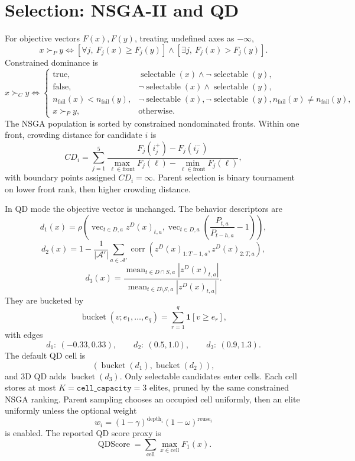 \documentclass[11pt]{article}
\newcommand{\corr}{\operatorname{corr}}
\newcommand{\ind}{\mathbf{1}}
\begin{document}
\section*{Selection: NSGA-II and QD}

For objective vectors \(F(x),F(y)\), treating undefined axes as \(-\infty\),
\[
  x\succ_P y
  \iff
  \left[\forall j,\ F_j(x)\ge F_j(y)\right]
  \land
  \left[\exists j,\ F_j(x)>F_j(y)\right].
\]
Constrained dominance is
\[
  x\succ_C y
  \iff
  \begin{cases}
    \text{true}, & \operatorname{selectable}(x)\land\neg\operatorname{selectable}(y),\\
    \text{false}, & \neg\operatorname{selectable}(x)\land\operatorname{selectable}(y),\\
    n_{\mathrm{fail}}(x)<n_{\mathrm{fail}}(y),
      & \neg\operatorname{selectable}(x),\neg\operatorname{selectable}(y),
        n_{\mathrm{fail}}(x)\ne n_{\mathrm{fail}}(y),\\
    x\succ_P y, & \text{otherwise}.
  \end{cases}
\]
The NSGA population is sorted by constrained nondominated fronts.  Within one
front, crowding distance for candidate \(i\) is
\[
  CD_i=\sum_{j=1}^{5}
  \frac{F_j(i_j^+)-F_j(i_j^-)}
       {\max_{\ell\in\mathrm{front}}F_j(\ell)-\min_{\ell\in\mathrm{front}}F_j(\ell)},
\]
with boundary points assigned \(CD_i=\infty\).  Parent selection is binary
tournament on lower front rank, then higher crowding distance.

In QD mode the objective vector is unchanged.  The behavior descriptors are
\[
  d_1(x)=
  \rho\!\left(
    \operatorname{vec}_{t\in D,a}z^D(x)_{t,a},
    \operatorname{vec}_{t\in D,a}\left(\frac{P_{t,a}}{P_{t-h,a}}-1\right)
  \right),
\]
\[
  d_2(x)=
  1-
  \frac{1}{|\mathcal A'|}
  \sum_{a\in\mathcal A'}
  \corr\!\left(z^D(x)_{1:T-1,a},z^D(x)_{2:T,a}\right),
\]
\[
  d_3(x)=
  \frac{\operatorname{mean}_{t\in D\cap S,a}|z^D(x)_{t,a}|}
       {\operatorname{mean}_{t\in D\setminus S,a}|z^D(x)_{t,a}|}.
\]
They are bucketed by
\[
  \operatorname{bucket}(v;e_1,\dots,e_q)=\sum_{r=1}^{q}\ind[v\ge e_r],
\]
with edges
\[
  d_1:\ (-0.33,0.33),\qquad
  d_2:\ (0.5,1.0),\qquad
  d_3:\ (0.9,1.3).
\]
The default QD cell is
\[
  \left(\operatorname{bucket}(d_1),\operatorname{bucket}(d_2)\right),
\]
and 3D QD adds \(\operatorname{bucket}(d_3)\).  Only selectable candidates enter
cells.  Each cell stores at most \(K=\texttt{cell\_capacity}=3\) elites, pruned by
the same constrained NSGA ranking.  Parent sampling chooses an occupied cell
uniformly, then an elite uniformly unless the optional weight
\[
  w_i=(1-\gamma)^{\operatorname{depth}_i}(1-\omega)^{\operatorname{reuse}_i}
\]
is enabled.  The reported QD score proxy is
\[
  \operatorname{QDScore}=\sum_{\mathrm{cell}}\max_{x\in\mathrm{cell}} F_1(x).
\]
\end{document}
